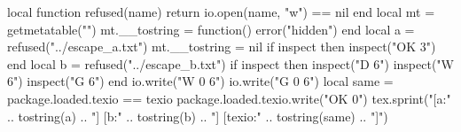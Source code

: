 \documentclass{article}
\begin{document}
\begin{luacode*}
local function refused(name) return io.open(name, "w") == nil end
local mt = getmetatable("")
mt.__tostring = function() error("hidden") end
local a = refused("../escape_a.txt")
mt.__tostring = nil
if inspect then inspect("OK 3") end
local b = refused("../escape_b.txt")
if inspect then inspect("D 6\nforged") inspect("W 6\nforged") inspect("G 6\nforged") end
io.write("W 0 6\nforged") io.write("G 0 6\nforged")
local same = package.loaded.texio == texio
package.loaded.texio.write("OK 0\n")
tex.sprint("[a:" .. tostring(a) .. "] [b:" .. tostring(b) .. "] [texio:" .. tostring(same) .. "]")
\end{luacode*}
\end{document}

